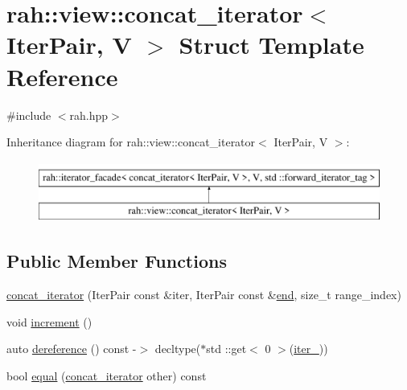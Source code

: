 \hypertarget{structrah_1_1view_1_1concat__iterator}{}\section{rah\+::view\+::concat\+\_\+iterator$<$ Iter\+Pair, V $>$ Struct Template Reference}
\label{structrah_1_1view_1_1concat__iterator}


{\ttfamily \#include $<$rah.\+hpp$>$}

Inheritance diagram for rah\+::view\+::concat\+\_\+iterator$<$ Iter\+Pair, V $>$\+:\begin{figure}[H]
\begin{center}
\leavevmode
\includegraphics[height=2.000000cm]{structrah_1_1view_1_1concat__iterator}
\end{center}
\end{figure}
\subsection*{Public Member Functions}
\begin{DoxyCompactItemize}
\item 
\mbox{\hyperlink{structrah_1_1view_1_1concat__iterator_a45e7ea9b72e7df5390a2ae09a6923d11}{concat\+\_\+iterator}} (Iter\+Pair const \&iter, Iter\+Pair const \&\mbox{\hyperlink{namespacerah_ac309d041d5f4110ecf2d1b44f4282275}{end}}, size\+\_\+t range\+\_\+index)
\item 
void \mbox{\hyperlink{structrah_1_1view_1_1concat__iterator_a6301909457da06a9894f4681353442b4}{increment}} ()
\item 
auto \mbox{\hyperlink{structrah_1_1view_1_1concat__iterator_a8449f70baf374fb27f6cf7dbb80e2d17}{dereference}} () const -\/$>$ decltype($\ast$std \+::get$<$ 0 $>$(\mbox{\hyperlink{structrah_1_1view_1_1concat__iterator_affb17b45b66a04b01962c8b84dc20c43}{iter\+\_\+}}))
\item 
bool \mbox{\hyperlink{structrah_1_1view_1_1concat__iterator_a6e8021ecde205f2ceba2c167a6954d05}{equal}} (\mbox{\hyperlink{structrah_1_1view_1_1concat__iterator}{concat\+\_\+iterator}} other) const
\end{DoxyCompactItemize}

